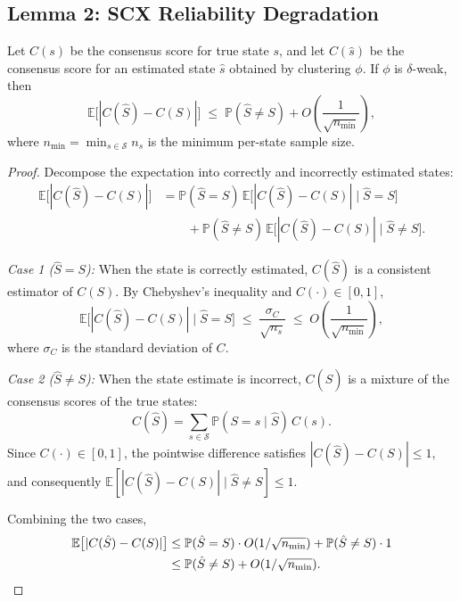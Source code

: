 \subsection{Lemma 2: SCX Reliability Degradation}
\label{sec:thm2:lemma2}

\begin{lemma}
\label{lem:scx-degradation}
Let $C(s)$ be the consensus score for true state $s$, and let $C(\hat{s})$
be the consensus score for an estimated state $\hat{s}$ obtained by clustering
$\phi$. If $\phi$ is $\delta$-weak, then
\begin{equation}
\mathbb{E}\bigl[|C(\hat{S}) - C(S)|\bigr]
\;\leq\; \mathbb{P}(\hat{S} \neq S) + O\!\left(\frac{1}{\sqrt{n_{\min}}}\right),
\label{eq:degradation-bound}
\end{equation}
where $n_{\min} = \min_{s \in \mathcal{S}} n_s$ is the minimum per-state
sample size.
\end{lemma}

\begin{proof}
Decompose the expectation into correctly and incorrectly estimated states:
\begin{align*}
\mathbb{E}\bigl[|C(\hat{S}) - C(S)|\bigr]
&= \mathbb{P}(\hat{S} = S)\,
   \mathbb{E}\bigl[|C(\hat{S}) - C(S)| \mid \hat{S} = S\bigr] \\
&\qquad + \mathbb{P}(\hat{S} \neq S)\,
   \mathbb{E}\bigl[|C(\hat{S}) - C(S)| \mid \hat{S} \neq S\bigr].
\end{align*}

\emph{Case 1 ($\hat{S} = S$):} When the state is correctly estimated,
$C(\hat{S})$ is a consistent estimator of $C(S)$. By Chebyshev's inequality
and $C(\cdot) \in [0,1]$,
\[
\mathbb{E}\bigl[|C(\hat{S}) - C(S)| \mid \hat{S} = S\bigr]
\;\leq\; \frac{\sigma_C}{\sqrt{n_s}}
\;\leq\; O\!\left(\frac{1}{\sqrt{n_{\min}}}\right),
\]
where $\sigma_C$ is the standard deviation of $C$.

\emph{Case 2 ($\hat{S} \neq S$):} When the state estimate is incorrect,
$C(\hat{S})$ is a mixture of the consensus scores of the true states:
\[
C(\hat{S}) = \sum_{s \in \mathcal{S}} \mathbb{P}(S = s \mid \hat{S})\, C(s).
\]
Since $C(\cdot) \in [0,1]$, the pointwise difference satisfies
$|C(\hat{S}) - C(S)| \leq 1$, and consequently
$\mathbb{E}[|C(\hat{S}) - C(S)| \mid \hat{S} \neq S] \leq 1$.

Combining the two cases,
\begin{align*}
\mathbb{E}\bigl[|C(\hat{S}) - C(S)|\bigr]
&\leq \mathbb{P}(\hat{S}=S) \cdot O(1/\sqrt{n_{\min}})
   + \mathbb{P}(\hat{S}\neq S) \cdot 1 \\
&\leq \mathbb{P}(\hat{S} \neq S) + O(1/\sqrt{n_{\min}}). \qedhere
\end{align*}
\end{proof}

